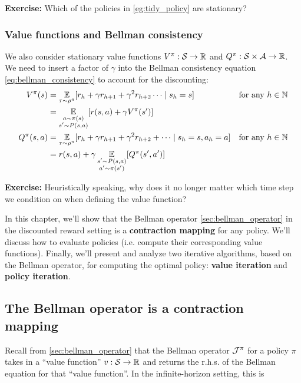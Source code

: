 \documentclass[../main/main]{subfiles}
\begin{document}
\textbf{Exercise:} Which of the policies in \ref{eg:tidy_policy} are stationary?

\subsubsection{Value functions and Bellman consistency}

We also consider stationary value functions $V^\pi : \mathcal{S} \to \mathbb{R}$ and $Q^\pi : \mathcal{S} \times \mathcal{A} \to \mathbb{R}$. We need to insert a factor of $\gamma$ into the Bellman consistency equation \eqref{eq:bellman_consistency} to account for the discounting:
\begin{equation}
\begin{aligned}
    V^\pi(s) &= \operatorname*{\mathbb{E}}_{\tau \sim \rho^\pi} [r_h + \gamma r_{h+1} + \gamma^2 r_{h+2} \cdots \mid s_h = s] && \text{for any } h \in \mathbb{N} \\
    &= \operatorname*{\mathbb{E}}_{\substack{a \sim \pi(s) \\ s' \sim P(s, a)}} [r(s, a) + \gamma V^\pi(s')]\\
    Q^\pi(s, a) &= \operatorname*{\mathbb{E}}_{\tau \sim \rho^\pi} [r_h + \gamma r_{h+1} + \gamma^2 r_{h+2} + \cdots \mid s_h = s, a_h = a] && \text{for any } h \in \mathbb{N} \\
    &= r(s, a) + \gamma \operatorname*{\mathbb{E}}_{\substack{s' \sim P(s, a) \\ a' \sim \pi(s')}} [Q^\pi(s', a')]
\end{aligned}
\label{eq:bellman_consistency_infinite}
\end{equation}

\textbf{Exercise:} Heuristically speaking, why does it no longer matter which time step we condition on when defining the value function?

In this chapter, we'll show that the Bellman operator \eqref{sec:bellman_operator} in the discounted reward setting is a \textbf{contraction mapping} for any policy. We'll discuss how to evaluate policies (i.e. compute their corresponding value functions). Finally, we'll present and analyze two iterative algorithms, based on the Bellman operator, for computing the optimal policy: \textbf{value iteration} and \textbf{policy iteration}.


\subsection{The Bellman operator is a contraction mapping}

Recall from \ref{sec:bellman_operator} that the Bellman operator $\mathcal{J}^{\pi}$ for a policy $\pi$ takes in a ``value function'' $v : \mathcal{S} \to \mathbb{R}$ and returns the r.h.s. of the Bellman equation for that ``value function''. In the infinite-horizon setting, this is
\end{document}
